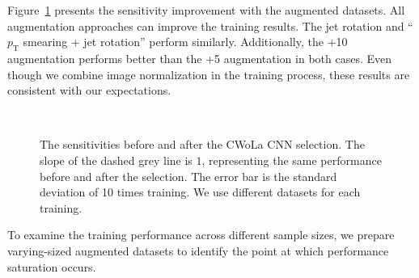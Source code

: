 \documentclass[12pt]{article}
\begin{document}
        Figure~\ref{fig:sensitivity_improvement_origin_pt_jet_aug_5_10_image_norm} presents the sensitivity improvement with the augmented datasets. All augmentation approaches can improve the training results. The jet rotation and ``$p_{\text{T}}$ smearing + jet rotation'' perform similarly. Additionally, the +10 augmentation performs better than the +5 augmentation in both cases. Even though we combine image normalization in the training process, these results are consistent with our expectations.
        \begin{figure}[htpb]
            \centering
             \\
            \caption{The sensitivities before and after the CWoLa CNN selection. The slope of the dashed grey line is $1$, representing the same performance before and after the selection. The error bar is the standard deviation of 10 times training. We use different datasets for each training.}
            \label{fig:sensitivity_improvement_origin_pt_jet_aug_5_10_image_norm}
        \end{figure}

        To examine the training performance across different sample sizes, we prepare varying-sized augmented datasets to identify the point at which performance saturation occurs.
\end{document}
